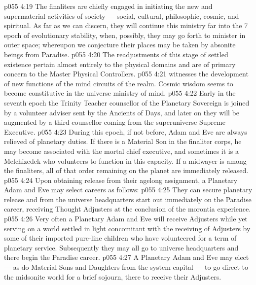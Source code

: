 \vs p055 4:19 The finaliters are chiefly engaged in initiating the new and supermaterial activities of society --- social, cultural, philosophic, cosmic, and spiritual. As far as we can discern, they will continue this ministry far into the 7 epoch of evolutionary stability, when, possibly, they may go forth to minister in outer space; whereupon we conjecture their places may be taken by absonite beings from Paradise.
\vs p055 4:20 \bibnobreakspace {} The readjustments of this stage of settled existence pertain almost entirely to the physical domains and are of primary concern to the Master Physical Controllers.
\vs p055 4:21 \bibnobreakspace {} witnesses the development of new functions of the mind circuits of the realm. Cosmic wisdom seems to become constitutive in the universe ministry of mind.
\vs p055 4:22 \bibnobreakspace {} Early in the seventh epoch the Trinity Teacher counsellor of the Planetary Sovereign is joined by a volunteer adviser sent by the Ancients of Days, and later on they will be augmented by a third counsellor coming from the superuniverse Supreme Executive.
\vs p055 4:23 During this epoch, if not before, Adam and Eve are always relieved of planetary duties. If there is a Material Son in the finaliter corps, he may become associated with the mortal chief executive, and sometimes it is a Melchizedek who volunteers to function in this capacity. If a midwayer is among the finaliters, all of that order remaining on the planet are immediately released.
\vs p055 4:24 \pc Upon obtaining release from their agelong assignment, a Planetary Adam and Eve may select careers as follows:
\vs p055 4:25 \bibnobreakspace They can secure planetary release and from the universe headquarters start out immediately on the Paradise career, receiving Thought Adjusters at the conclusion of the morontia experience.
\vs p055 4:26 \bibnobreakspace Very often a Planetary Adam and Eve will receive Adjusters while yet serving on a world settled in light concomitant with the receiving of Adjusters by some of their imported pure\hyp{}line children who have volunteered for a term of planetary service. Subsequently they may all go to universe headquarters and there begin the Paradise career.
\vs p055 4:27 \bibnobreakspace A Planetary Adam and Eve may elect --- as do Material Sons and Daughters from the system capital --- to go direct to the midsonite world for a brief sojourn, there to receive their Adjusters.
